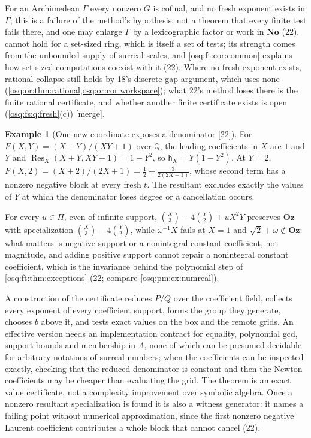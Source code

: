 \documentclass[11pt,letterpaper]{article}
\numberwithin{equation}{section}
\theoremstyle{definition}
\newtheorem{example}[example]{Example}
\theoremstyle{remark}
\theoremstyle{plain}
\newcommand{\No}{\mathbf{No}}
\newcommand{\Oz}{\mathbf{Oz}}
\newcommand{\Q}{\mathbb Q}
\newcommand{\src}[1]{\textup{\textsf{[#1]}}}
\newcommand{\merge}{\textup{\textsf{[merge]}}}
\begin{document}
For an Archimedean $\Gamma$ every nonzero $G$ is cofinal, and no fresh exponent exists in $\Gamma$; this is a failure of the method's hypothesis, not a
theorem that every finite test fails there, and one may enlarge $\Gamma$ by a lexicographic factor or work in $\No$ (22). 
cannot hold for a set-sized ring, which is itself a set of tests; its strength comes from the unbounded supply of surreal scales, and
\cref{osq:ft:cor:common} explains how set-sized computations coexist with it (22). Where no fresh exponent exists, rational collapse still holds by 18's
discrete-gap argument, which uses none (\cref{osq:or:thm:rational,osq:or:cor:workspace}); what 22's method loses there is the finite rational
certificate, and whether another finite certificate exists is open (\cref{osq:fs:q:fresh}(c)) \merge.

\begin{example}[One new coordinate exposes a denominator \src{22}]\label{osq:ft:ex:resultant}
For $F(X,Y)=(X+Y)/(XY+1)$ over $\Q$, the leading coefficients in $X$ are $1$ and $Y$ and $\operatorname{Res}_X(X+Y,XY+1)=1-Y^2$, so
$\mathsf h_X=Y(1-Y^2)$. At $Y=2$, $F(X,2)=(X+2)/(2X+1)=\frac12+\frac3{2(2X+1)}$, whose second term has a nonzero negative block at every fresh $t$. The
resultant excludes exactly the values of $Y$ at which the denominator loses degree or a cancellation occurs.
\end{example}

For every $u\in\Pi$, even of infinite support, $\binom X3-4\binom Y2+uX^2Y$ preserves $\Oz$ with specialization $\binom X3-4\binom Y2$, while
$\omega^{-1}X$ fails at $X=1$ and $\sqrt2+\omega\notin\Oz$: what matters is negative support or a nonintegral constant coefficient, not magnitude, and
adding positive support cannot repair a nonintegral constant coefficient, which is the invariance behind the polynomial step of
\cref{osq:ft:thm:exceptions} (22; compare \cref{osq:pm:ex:numreal}).

A construction of the certificate reduces $P/Q$ over the coefficient field, collects every exponent of every coefficient support, forms the group they
generate, chooses $b$ above it, and tests exact values on the box and the remote grids. An effective version needs an implementation contract for
equality, polynomial gcd, support bounds and membership in $\Lambda$, none of which can be presumed decidable for arbitrary notations of surreal numbers;
when the coefficients can be inspected exactly, checking that the reduced denominator is constant and then the Newton coefficients may be cheaper than
evaluating the grid. The theorem is an exact value certificate, not a complexity improvement over symbolic algebra. Once a nonzero resultant
specialization is found it is also a witness generator: it names a failing point without numerical approximation, since the first nonzero negative
Laurent coefficient contributes a whole block that cannot cancel (22).
\end{document}
